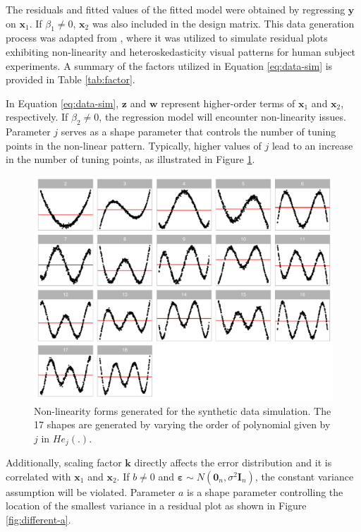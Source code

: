 \documentclass[]{interact}
\theoremstyle{plain}%
\theoremstyle{definition}
\theoremstyle{remark}
\begin{document}
The residuals and fitted values of the fitted model were obtained by
regressing \(\boldsymbol{y}\) on \(\boldsymbol{x}_1\). If
\(\beta_1 \neq 0\), \(\boldsymbol{x}_2\) was also included in the design
matrix. This data generation process was adapted from
\citet{li2024plot}, where it was utilized to simulate residual plots
exhibiting non-linearity and heteroskedasticity visual patterns for
human subject experiments. A summary of the factors utilized in Equation
\ref{eq:data-sim} is provided in Table \ref{tab:factor}.

In Equation \ref{eq:data-sim}, \(\boldsymbol{z}\) and \(\boldsymbol{w}\)
represent higher-order terms of \(\boldsymbol{x}_1\) and
\(\boldsymbol{x}_2\), respectively. If \(\beta_2 \neq 0\), the
regression model will encounter non-linearity issues. Parameter \(j\)
serves as a shape parameter that controls the number of tuning points in
the non-linear pattern. Typically, higher values of \(j\) lead to an
increase in the number of tuning points, as illustrated in Figure
\ref{fig:different-j}.

\begin{figure}[!h]

{\centering \includegraphics[width=1\linewidth]{appendix_files/figure-latex/different-j-1} 

}

\caption{Non-linearity forms generated for the synthetic data simulation. The 17 shapes are generated by varying the order of polynomial given by $j$ in $He_j(.)$.}\label{fig:different-j}
\end{figure}

Additionally, scaling factor \(\boldsymbol{k}\) directly affects the
error distribution and it is correlated with \(\boldsymbol{x}_1\) and
\(\boldsymbol{x}_2\). If \(b \neq 0\) and
\(\boldsymbol{\varepsilon} \sim N(\boldsymbol{0}_n, \sigma^2\boldsymbol{I}_n)\),
the constant variance assumption will be violated. Parameter \(a\) is a
shape parameter controlling the location of the smallest variance in a
residual plot as shown in Figure \ref{fig:different-a}.
\end{document}
